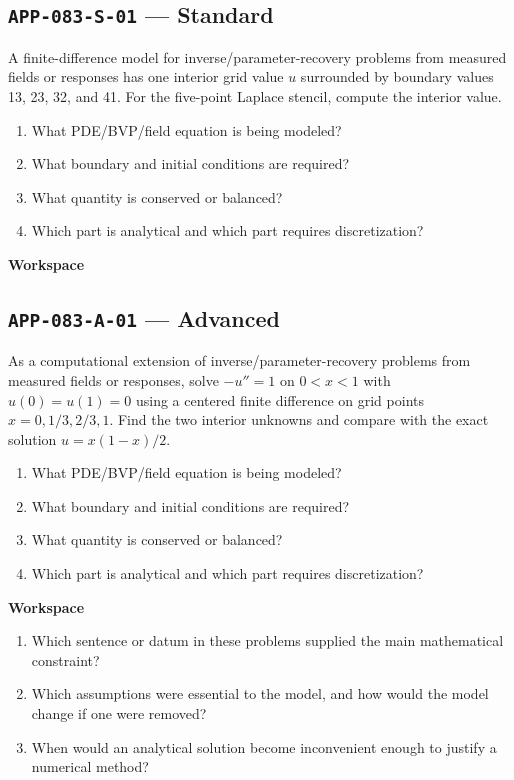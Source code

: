 \documentclass[11pt]{book}
\newcommand{\pid}[1]{\texttt{#1}}
\newcommand{\workspace}{\par\vspace{0.7in}\hrulefill\par\vspace{0.55in}\hrulefill\par}
\begin{document}
\subsection*{\pid{APP-083-S-01} — Standard}
\begin{problembox}
A finite-difference model for inverse/parameter-recovery problems from measured fields or responses has one interior grid value $u$ surrounded by boundary values 13, 23, 32, and 41. For the five-point Laplace stencil, compute the interior value.
\end{problembox}
\begin{promptbox}\begin{enumerate}
\item What PDE/BVP/field equation is being modeled?
\item What boundary and initial conditions are required?
\item What quantity is conserved or balanced?
\item Which part is analytical and which part requires discretization?
\end{enumerate}\end{promptbox}
\textbf{Workspace}\workspace
{}
\subsection*{\pid{APP-083-A-01} — Advanced}
\begin{problembox}
As a computational extension of inverse/parameter-recovery problems from measured fields or responses, solve $-u''=1$ on $0<x<1$ with $u(0)=u(1)=0$ using a centered finite difference on grid points $x=0,1/3,2/3,1$. Find the two interior unknowns and compare with the exact solution $u=x(1-x)/2$.
\end{problembox}
\begin{promptbox}\begin{enumerate}
\item What PDE/BVP/field equation is being modeled?
\item What boundary and initial conditions are required?
\item What quantity is conserved or balanced?
\item Which part is analytical and which part requires discretization?
\end{enumerate}\end{promptbox}
\textbf{Workspace}\workspace
\begin{reflectionbox}\begin{enumerate}
\item Which sentence or datum in these problems supplied the main mathematical constraint?
\item Which assumptions were essential to the model, and how would the model change if one were removed?
\item When would an analytical solution become inconvenient enough to justify a numerical method?
\end{enumerate}\end{reflectionbox}
\end{document}
